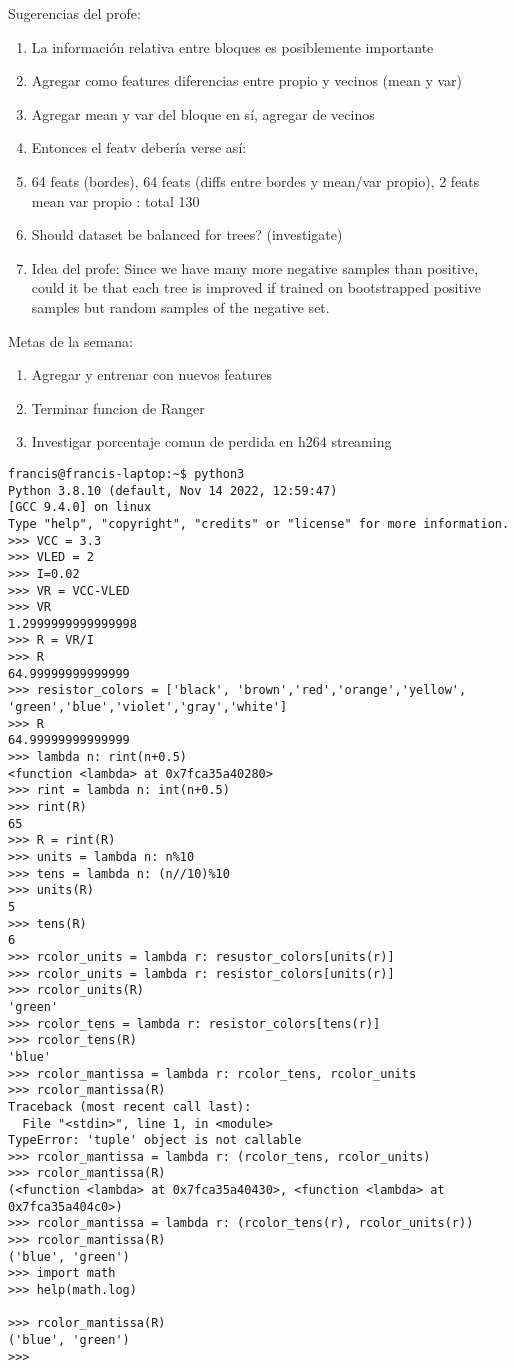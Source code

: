 \documentclass[12pt,oneside]{book}
\begin{document}
  Sugerencias del profe:
  \begin{enumerate}
    \item La información relativa entre bloques es posiblemente importante
    \item Agregar como features diferencias entre propio y vecinos (mean y var)
    \item Agregar mean y var del bloque en sí, agregar de vecinos
    \item Entonces el featv debería verse así:
    \item 64 feats (bordes), 64 feats (diffs entre bordes y mean/var propio), 2 feats mean var propio : total 130
    \item Should dataset be balanced for trees? (investigate)
    \item Idea del profe: Since we have many more negative samples than positive, could it be that each tree is improved if trained on bootstrapped positive samples but random samples of the negative set.
  \end{enumerate}

  Metas de la semana:
  \begin{enumerate}
    \item Agregar y entrenar con nuevos features
    \item Terminar funcion de Ranger
    \item Investigar porcentaje comun de perdida en h264 streaming
  \end{enumerate}

  
  \begin{lstlisting}
francis@francis-laptop:~$ python3
Python 3.8.10 (default, Nov 14 2022, 12:59:47) 
[GCC 9.4.0] on linux
Type "help", "copyright", "credits" or "license" for more information.
>>> VCC = 3.3
>>> VLED = 2
>>> I=0.02
>>> VR = VCC-VLED
>>> VR
1.2999999999999998
>>> R = VR/I
>>> R
64.99999999999999
>>> resistor_colors = ['black', 'brown','red','orange','yellow', 'green','blue','violet','gray','white']
>>> R
64.99999999999999
>>> lambda n: rint(n+0.5)
<function <lambda> at 0x7fca35a40280>
>>> rint = lambda n: int(n+0.5)
>>> rint(R)
65
>>> R = rint(R)
>>> units = lambda n: n%10
>>> tens = lambda n: (n//10)%10
>>> units(R)
5
>>> tens(R)
6
>>> rcolor_units = lambda r: resustor_colors[units(r)]
>>> rcolor_units = lambda r: resistor_colors[units(r)]
>>> rcolor_units(R)
'green'
>>> rcolor_tens = lambda r: resistor_colors[tens(r)]
>>> rcolor_tens(R)
'blue'
>>> rcolor_mantissa = lambda r: rcolor_tens, rcolor_units
>>> rcolor_mantissa(R)
Traceback (most recent call last):
  File "<stdin>", line 1, in <module>
TypeError: 'tuple' object is not callable
>>> rcolor_mantissa = lambda r: (rcolor_tens, rcolor_units)
>>> rcolor_mantissa(R)
(<function <lambda> at 0x7fca35a40430>, <function <lambda> at 0x7fca35a404c0>)
>>> rcolor_mantissa = lambda r: (rcolor_tens(r), rcolor_units(r))
>>> rcolor_mantissa(R)
('blue', 'green')
>>> import math
>>> help(math.log)

>>> rcolor_mantissa(R)
('blue', 'green')
>>> 
  \end{lstlisting}
\end{document}
